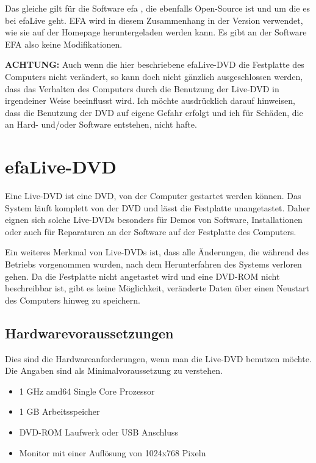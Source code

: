 \documentclass[a4paper,12pt,twoside]{article}
\begin{document}
Das gleiche gilt für die Software efa \cite{EFA1}, die ebenfalls
Open-Source ist und um die es bei efaLive geht. EFA wird in diesem Zusammenhang
in der Version verwendet, wie sie auf der Homepage heruntergeladen werden kann. 
Es gibt an der Software EFA also keine Modifikationen.

\bigskip
\textbf{ACHTUNG:} Auch wenn die hier beschriebene efaLive-DVD die Festplatte des
Computers nicht verändert, so kann doch nicht gänzlich ausgeschlossen
werden, dass das Verhalten des Computers durch die Benutzung der
Live-DVD in irgendeiner Weise beeinflusst wird. Ich möchte ausdrücklich
darauf hinweisen, dass die Benutzung der DVD auf eigene Gefahr erfolgt
und ich für Schäden, die an Hard- und/oder Software entstehen, nicht
hafte.
\bigskip

\section{efaLive-DVD}
\label{sct:efalivecd}
Eine Live-DVD ist eine DVD, von der Computer
gestartet werden können. Das System läuft komplett von der DVD und lässt
die Festplatte unangetastet. Daher eignen sich solche Live-DVDs
besonders für Demos von Software, Installationen oder auch für
Reparaturen an der Software auf der Festplatte des Computers.

Ein weiteres Merkmal von Live-DVDs ist, dass alle Änderungen, die während
des Betriebs vorgenommen wurden, nach dem Herunterfahren des Systems
verloren gehen. Da die Festplatte nicht angetastet wird und eine DVD-ROM
nicht beschreibbar ist, gibt es keine Möglichkeit, veränderte Daten
über einen Neustart des Computers hinweg zu speichern.

\subsection{Hardwarevoraussetzungen}
\label{sct:live_hardware}
Dies sind die Hardwareanforderungen, wenn man die Live-DVD benutzen
möchte. Die Angaben sind als Minimalvoraussetzung zu verstehen.

\begin{itemize}
    \item 1 GHz amd64 Single Core Prozessor
    \item 1 GB Arbeitsspeicher
    \item DVD-ROM Laufwerk oder USB Anschluss
    \item Monitor mit einer Auflösung von 1024x768 Pixeln
\end{itemize}
\end{document}
